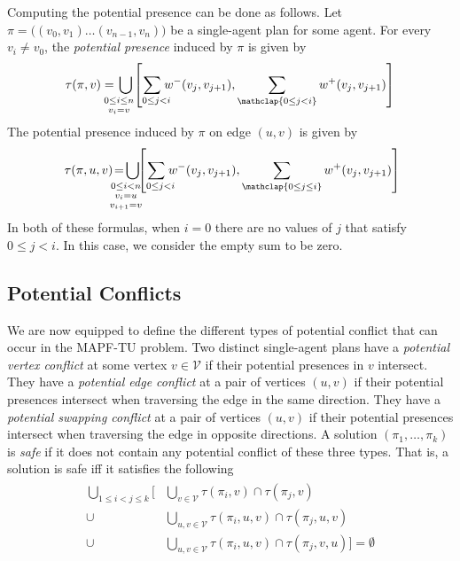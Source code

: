 \documentclass[jair,twoside,11pt,theapa]{article}
\newcommand{\vertices}{\mathcal{V}}
\newcommand{\timel}{w^-}
\newcommand{\timeu}{w^+}
\newcommand{\vertexpath}{\pi}
\newcommand{\potential}{\tau}
\newtheorem{definition}{Definition}
\begin{document}

Computing the potential presence can be done as follows. 
Let $\vertexpath = \big((v_0,v_1) \dots (v_{n-1},v_n)\big)$ be a single-agent plan for some agent. 
For every $v_i\neq v_0$, the \emph{potential presence} induced by $\vertexpath$ is given by
\begin{equation}
  \potential(\vertexpath, v) = \bigcup_{\!\!\!\!\!\!\!\!\substack{0 \leq i \leq n\\[0.2em] v_i = v}}\!\left[\sum_{0 \leq j < i\!\!\!\!\!} \timel(v_j, v_{j+1}), \sum_{\mathclap{0 \leq j < i}} \timeu(v_j, v_{j+1})\right]
\end{equation}
The potential presence induced by $\vertexpath$ on edge $(u, v)$ is given by
\begin{equation}
  \potential(\vertexpath, u, v) \!= \!\!\bigcup_{\!\!\!\!\!\!\!\!\substack{0 \leq i < n\\[0.2em] v_i = u\\[0.2em] v_{i+1} = v}}\!\!\!\left[\sum_{0 \leq j < i\!\!\!\!\!} \timel(v_j, v_{j+1}), \sum_{\mathclap{0 \leq j \leq i}} \timeu(v_j, v_{j+1})\right]\!\!
\end{equation}
In both of these formulas, when $i=0$ there are no values of $j$ that satisfy $0\leq j<i$. In this case, we consider the empty sum to be zero. 


\subsection{Potential Conflicts}
We are now equipped to define the different types of potential conflict that can occur in the MAPF-TU problem.
Two distinct single-agent plans have a \emph{potential vertex conflict} at some vertex $v \in \vertices$ if their potential presences in $v$ intersect. 
They have a \emph{potential edge conflict} at a pair of vertices $(u, v)$ if their potential presences intersect when traversing the edge in the same direction.  
They have a \emph{potential swapping conflict} at a pair of vertices $(u, v)$ if their potential presences intersect when traversing the edge in opposite directions. 
A solution $(\pi_1,\ldots,\pi_k)$ is \emph{safe} if it does not contain any potential conflict of these three types.  
That is, a solution is safe iff it satisfies the following
\begin{align}
\begin{split}
  \bigcup_{1 \leq i < j \leq k} \Big[&\bigcup_{v\in\vertices} \potential(\vertexpath_i, v) \cap \potential(\vertexpath_j, v)\\
  \cup&\bigcup_{u, v\in\vertices} \potential(\vertexpath_i, u, v) \cap \potential(\vertexpath_j, u, v)\\
  \cup&\bigcup_{u, v\in\vertices} \potential(\vertexpath_i, u, v) \cap \potential(\vertexpath_j, v, u)\Big] = \emptyset
\end{split}
\end{align}
\end{document}
